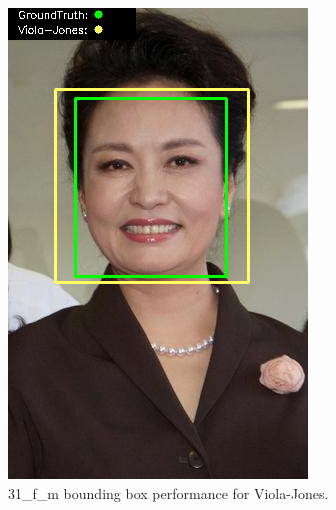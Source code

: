 \documentclass{l4proj}
\begin{document}
\begin{appendices}
\begin{figure}[h!]
\begin{minipage}{0.49\textwidth}
     \includegraphics[width=\textwidth]{images/appendix/viola/31.png}
    \caption{31\_f\_m bounding box performance for Viola-Jones.}
    \label{whoopi_result}
  \end{minipage}
\end{figure}


\end{appendices}
\end{document}

